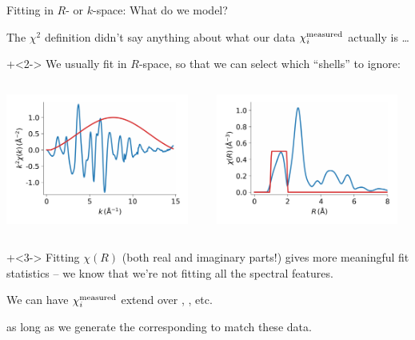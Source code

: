 \begin{slide}{Fitting in $R$- or $k$-space:  What do we model?}

  \begin{cenpage}{135mm}
  The $\chi^2$ definition didn't say anything about what our data
  $\chi_i^{\rm measured}$ actually is \ldots

  \onslide+<2->
  \vmm  We usually fit in $R$-space, so that  we can select which
  ``shells'' to ignore:

  \vmm \vmm

  \begin{columns}
    \begin{column}{65mm}
      \includegraphics[width=60mm]{figs/experiment/chikw_win}
    \end{column}
    \begin{column}{65mm}
      \includegraphics[width=60mm]{figs/experiment/chir_win}
    \end{column}
  \end{columns}

  \onslide+<3->
  Fitting $\chi(R)$ (both real and imaginary parts!) gives more
  meaningful fit statistics -- we know that we're not fitting all the
  spectral features.

  \vmm
  {}    We can have $\chi_i^{\rm measured}$  extend over
    {}, {},  etc.

    \vmm
  as long as we generate the corresponding {} to
  match these data.

  \vfill
  \end{cenpage}
\end{slide}

